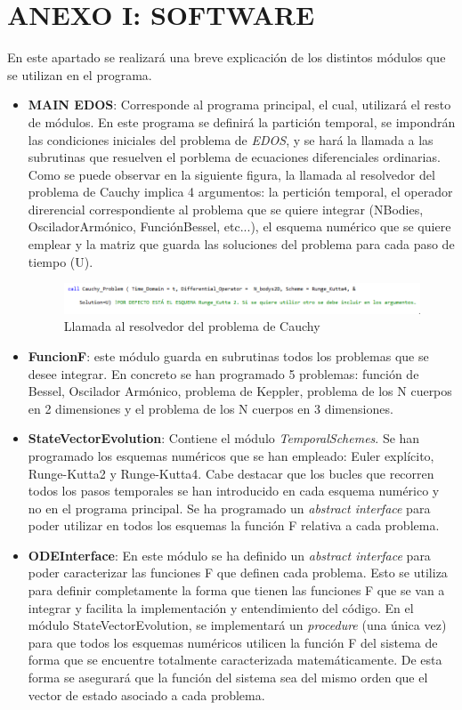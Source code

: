 \documentclass[11pt,singlespacing,liststotoc,headsepline,a4paper]{article}
\begin{document}
\section*{ANEXO I: SOFTWARE}
En este apartado se realizará una breve explicación de los distintos módulos que se utilizan en el programa.

\begin{itemize}
\item \textbf{MAIN EDOS}: Corresponde al programa principal, el cual, utilizará el resto de módulos. En este programa se definirá la partición temporal, se impondrán las condiciones iniciales del problema de \textit{EDOS}, y se hará la llamada a las subrutinas que resuelven el porblema de ecuaciones diferenciales ordinarias. Como se puede observar en la siguiente figura, la llamada al resolvedor del problema de Cauchy implica 4 argumentos: la pertición temporal, el operador direrencial correspondiente al problema que se quiere integrar (NBodies, OsciladorArmónico, FunciónBessel, etc...), el esquema numérico que se quiere emplear y la matriz que guarda las soluciones del problema para cada paso de tiempo (U).

\begin{figure}[H]
	\centering
	\includegraphics[width=1\textwidth]{call_CProblem.PNG}
	\caption{Llamada al resolvedor del problema de Cauchy}
\end{figure}

\item \textbf{FuncionF}: este módulo guarda en subrutinas todos los problemas que se desee integrar. En concreto se han programado 5 problemas: función de Bessel, Oscilador Armónico, problema de Keppler, problema de los N cuerpos en 2 dimensiones y el problema de los N cuerpos en 3 dimensiones. 

\item \textbf{StateVectorEvolution}: Contiene el módulo \textit{TemporalSchemes}. Se han programado los esquemas numéricos que se han empleado: Euler explícito, Runge-Kutta2 y Runge-Kutta4. Cabe destacar que los bucles que recorren todos los pasos temporales se han introducido en cada esquema numérico y no en el programa principal. Se ha programado un \textit{abstract interface} para poder utilizar en todos los esquemas la función F relativa a cada problema. 

\item \textbf{ODEInterface}: En este módulo se ha definido un \textit{abstract interface} para poder caracterizar las funciones F que definen cada problema. Esto se utiliza para definir completamente la forma que tienen las funciones F que se van a integrar y facilita la implementación y entendimiento del código. En el módulo StateVectorEvolution, se implementará un \textit{procedure} (una única vez) para que todos los esquemas numéricos utilicen la función F del sistema de forma que se encuentre totalmente caracterizada matemáticamente. De esta forma se asegurará que la función del sistema sea del mismo orden que el vector de estado asociado a cada problema.


\end{itemize}
\end{document}
